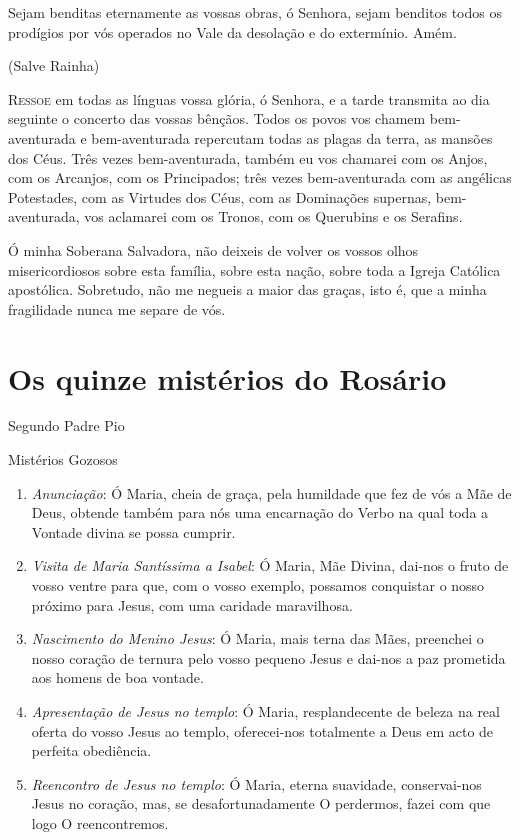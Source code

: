 \documentclass[10pt,twoside,a5paper]{article}
\begin{document}
	Sejam benditas eternamente as vossas obras, ó Senhora, sejam benditos todos os prodígios por vós operados no Vale da desolação e do extermínio. Amém.
	
	(Salve Rainha)
	
	\lettrine{R}{essoe} em todas as línguas vossa glória, ó Senhora, e a tarde transmita ao dia seguinte o concerto das vossas bênçãos. Todos os povos vos chamem bem-aventurada e bem-aventurada repercutam todas as plagas da terra, as mansões dos Céus. Três vezes bem-aventurada, também eu vos chamarei com os Anjos, com os Arcanjos, com os Principados; três vezes bem-aventurada com as angélicas Potestades, com as Virtudes dos Céus, com as Dominações supernas, bem-aventurada, vos aclamarei com os Tronos, com os Querubins e os Serafins.
	
	Ó minha Soberana Salvadora, não deixeis de volver os vossos olhos misericordiosos sobre esta família, sobre esta nação, sobre toda a Igreja Católica apostólica. Sobretudo, não me negueis a maior das graças, isto é, que a minha fragilidade nunca me separe de vós.
	
	\section*{Os quinze mistérios do Rosário}
	
	Segundo Padre Pio
	
	Mistérios Gozosos

	\begin{enumerate}
		\item \textit{Anunciação}: Ó Maria, cheia de graça, pela humildade que fez de vós a Mãe de Deus, obtende também para nós uma encarnação do Verbo na qual toda a Vontade divina se possa cumprir.
		
		\item \textit{Visita de Maria Santíssima a Isabel}: Ó Maria, Mãe Divina, dai-nos o fruto de vosso ventre para que, com o vosso exemplo, possamos conquistar o nosso próximo para Jesus, com uma caridade maravilhosa.
		
		\item \textit{Nascimento do Menino Jesus}: Ó Maria, mais terna das Mães, preenchei o nosso coração de ternura pelo vosso pequeno Jesus e dai-nos a paz prometida aos homens de boa vontade.
		
		\item \textit{Apresentação de Jesus no templo}: Ó Maria, resplandecente de beleza na real oferta do vosso Jesus ao templo, oferecei-nos totalmente a Deus em acto de perfeita obediência.
		
		\item \textit{Reencontro de Jesus no templo}: Ó Maria, eterna suavidade, conservai-nos Jesus no coração, mas, se desafortunadamente O perdermos, fazei com que logo O reencontremos.
	\end{enumerate}
	
\end{document}
